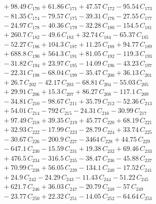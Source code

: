 \documentclass[a4paper,11pt]{article}
\begin{document}
\begin{align}
&\quad + 98.49\,C_{170} + 61.86\,C_{171} + 47.57\,C_{172} - 95.54\,C_{173} \nonumber\\
&\quad - 81.35\,C_{174} - 79.57\,C_{175} - 39.31\,C_{176} - 27.55\,C_{177} \nonumber\\
&\quad - 24.97\,C_{178} - 40.36\,C_{179} - 32.28\,C_{180} - 154.5\,C_{181} \nonumber\\
&\quad + 260.7\,C_{182} - 49.6\,C_{183} + 32.74\,C_{184} - 65.37\,C_{185} \nonumber\\
&\quad - 52.27\,C_{186} + 104.3\,C_{187} + 11.25\,C_{188} + 94.77\,C_{189} \nonumber\\
&\quad + 688.8\,C_{190} + 564.3\,C_{191} + 81.05\,C_{192} - 119.3\,C_{193} \nonumber\\
&\quad - 31.82\,C_{194} + 23.97\,C_{195} - 14.09\,C_{196} - 43.23\,C_{197} \nonumber\\
&\quad - 22.31\,C_{198} - 68.04\,C_{199} - 35.47\,C_{200} + 36.13\,C_{201} \nonumber\\
&\quad + 26.7\,C_{202} - 42.17\,C_{203} - 68.81\,C_{204} - 55.03\,C_{205} \nonumber\\
&\quad + 29.91\,C_{206} + 15.3\,C_{207} + 86.27\,C_{208} - 117.1\,C_{209} \nonumber\\
&\quad - 34.81\,C_{210} - 98.67\,C_{211} + 35.79\,C_{212} - 52.36\,C_{213} \nonumber\\
&\quad + 54.01\,C_{214} - 792\,C_{215} - 24.31\,C_{216} - 30.99\,C_{217} \nonumber\\
&\quad + 97.49\,C_{218} + 39.35\,C_{219} + 45.77\,C_{220} + 68.19\,C_{221} \nonumber\\
&\quad + 32.93\,C_{222} - 17.99\,C_{223} - 28.79\,C_{224} + 33.74\,C_{225} \nonumber\\
&\quad - 30.67\,C_{226} - 200.9\,C_{227} - 3464\,C_{228} + 44.75\,C_{229} \nonumber\\
&\quad - 647.1\,C_{230} - 15.59\,C_{231} + 19.38\,C_{232} + 69.46\,C_{233} \nonumber\\
&\quad + 476.5\,C_{234} - 316.5\,C_{235} - 38.47\,C_{236} - 45.88\,C_{237} \nonumber\\
&\quad + 70.99\,C_{238} + 56.05\,C_{239} - 134.1\,C_{240} - 17.52\,C_{241} \nonumber\\
&\quad + 24.9\,C_{242} - 24.29\,C_{243} - 11.43\,C_{244} - 51.22\,C_{245} \nonumber\\
&\quad + 621.7\,C_{246} + 36.03\,C_{247} - 20.79\,C_{248} - 57\,C_{249} \nonumber\\
&\quad - 23.77\,C_{250} + 22.32\,C_{251} - 14.05\,C_{252} - 64.64\,C_{253} \nonumber\\

\end{align}
\end{document}
